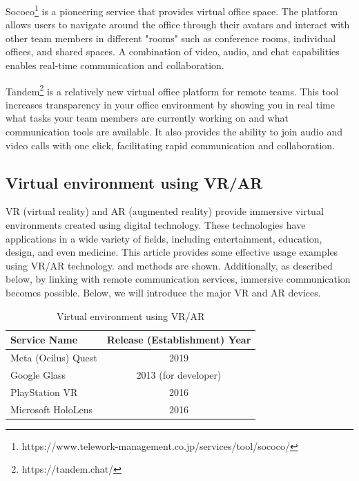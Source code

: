 \documentclass[12pt]{article}
\begin{document}
Sococo\footnote{https://www.telework-management.co.jp/services/tool/sococo/} is
a pioneering service that provides virtual office space. The platform
allows users to navigate around the office through their avatars and interact
with other team members in different "rooms" such as conference rooms,
individual offices, and shared spaces. A combination of video, audio, and chat
capabilities enables real-time communication and collaboration.

Tandem\footnote{https://tandem.chat/} is a relatively new virtual office
platform for remote teams. This tool
increases transparency in your office environment by showing you in real time
what tasks your team members are currently working on and what communication
tools are available. It also provides the ability to join audio and video calls
with one click, facilitating rapid communication and collaboration.

\subsection{Virtual environment using VR/AR}
VR (virtual reality) and AR (augmented reality) provide immersive virtual
environments created using digital technology. These technologies have
applications in a wide variety of fields, including entertainment, education,
design, and even medicine. This article\cite{vr_usecase} provides some
effective
usage examples using VR/AR technology. and methods are
shown. Additionally, as described below, by linking with remote communication
services, immersive communication becomes possible. Below, we will introduce
the major VR and AR devices.

\begin{table}[h]
    \begin{center}
        \begin{tabular}{|l|c|} \hline
            Service Name        & Release (Establishment) Year \\ \hline
            Meta (Ocilus) Quest & 2019                         \\
            Google Glass        & 2013 (for developer)         \\
            PlayStation VR      & 2016                         \\
            Microsoft HoloLens  & 2016                         \\ \hline
        \end{tabular}
        \caption{Virtual environment using VR/AR}
    \end{center}
\end{table}
\end{document}
